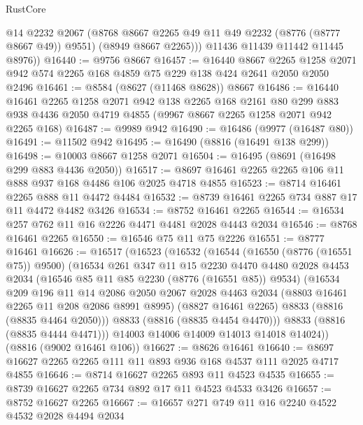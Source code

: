 \begin{lexlean}{RustCore}
\begin{coremodule}
            @14
            @2232
            @2067
            (@8768 @8667 @2265 @49 @11 @49 @2232 (@8776 (@8777 @8667 @49)) @9551)
            (@8949 @8667 @2265)))
        @11436
        @11439
        @11442
        @11445
        @8976))
@16440 := @9756 @8667
@16457 := @16440
    @8667
    @2265
    @1258
    @2071
    @942
    @574
    @2265
    @168
    @4859
    @75
    @229
    @138
    @424
    @2641
    @2050
    @2050
    @2496
@16461 := @8584 (@8627 (@11468 @8628)) @8667
@16486 := @16440
    @16461
    @2265
    @1258
    @2071
    @942
    @138
    @2265
    @168
    @2161
    @80
    @299
    @883
    @938
    @4436
    @2050
    @4719
    @4855
    (@9967 @8667 @2265 @1258 @2071 @942 @2265 @168)
@16487 := @9989 @942
@16490 := @16486 (@9977 (@16487 @80))
@16491 := @11502 @942
@16495 := @16490 (@8816 (@16491 @138 @299))
@16498 := @10003 @8667 @1258 @2071
@16504 := @16495 (@8691 (@16498 @299 @883 @4436 @2050))
@16517 := @8697 @16461 @2265 @2265 @106 @11 @888 @937 @168 @4486 @106 @2025 @4718 @4855
@16523 := @8714 @16461 @2265 @888 @11 @4472 @4484
@16532 := @8739 @16461 @2265 @734 @887 @17 @11 @4472 @4482 @3426
@16534 := @8752 @16461 @2265
@16544 := @16534 @257 @762 @11 @16 @2226 @4471 @4481 @2028 @4443 @2034
@16546 := @8768 @16461 @2265
@16550 := @16546 @75 @11 @75 @2226
@16551 := @8777 @16461
@16626 := @16517
    (@16523
      (@16532
        (@16544
          (@16550 (@8776 (@16551 @75)) @9500)
          (@16534
            @261
            @347
            @11
            @15
            @2230
            @4470
            @4480
            @2028
            @4453
            @2034
            (@16546 @85 @11 @85 @2230 (@8776 (@16551 @85)) @9534)
            (@16534
              @209
              @196
              @11
              @14
              @2086
              @2050
              @2067
              @2028
              @4463
              @2034
              (@8803 @16461 @2265 @11 @208 @2086 @8991 @8995)
              (@8827 @16461 @2265)
              @8833
              (@8816 (@8835 @4464 @2050)))
            @8833
            (@8816 (@8835 @4454 @4470)))
          @8833
          (@8816 (@8835 @4444 @4471)))
        @14003
        @14006
        @14009
        @14013
        @14018
        @14024))
    (@8816 (@9002 @16461 @106))
@16627 := @8626 @16461
@16640 := @8697 @16627 @2265 @2265 @111 @11 @893 @936 @168 @4537 @111 @2025 @4717 @4855
@16646 := @8714 @16627 @2265 @893 @11 @4523 @4535
@16655 := @8739 @16627 @2265 @734 @892 @17 @11 @4523 @4533 @3426
@16657 := @8752 @16627 @2265
@16667 := @16657 @271 @749 @11 @16 @2240 @4522 @4532 @2028 @4494 @2034

\end{coremodule}
\end{lexlean}
